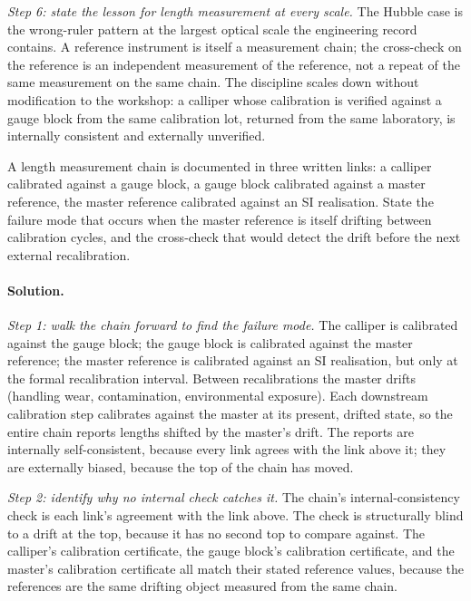 \emph{Step 6: state the lesson for length measurement at every
scale.}
The Hubble case is the wrong-ruler pattern at the largest optical
scale the engineering record contains. A reference instrument is
itself a measurement chain; the cross-check on the reference is an
independent measurement of the reference, not a repeat of the same
measurement on the same chain. The discipline scales down without
modification to the workshop: a calliper whose calibration is
verified against a gauge block from the same calibration lot,
returned from the same laboratory, is internally consistent and
externally unverified.

\begin{exercise}
A length measurement chain is documented in three written links: a
calliper calibrated against a gauge block, a gauge block calibrated
against a master reference, the master reference calibrated against
an SI realisation. State the failure mode that occurs when the
master reference is itself drifting between calibration cycles, and
the cross-check that would detect the drift before the next external
recalibration.
\end{exercise}

\paragraph{Solution.}

\emph{Step 1: walk the chain forward to find the failure mode.}
The calliper is calibrated against the gauge block; the gauge
block is calibrated against the master reference; the master
reference is calibrated against an SI realisation, but only at
the formal recalibration interval. Between recalibrations the
master drifts (handling wear, contamination, environmental
exposure). Each downstream calibration step calibrates against
the master at its present, drifted state, so the entire chain
reports lengths shifted by the master's drift. The reports are
internally self-consistent, because every link agrees with the
link above it; they are externally biased, because the top of the
chain has moved.

\emph{Step 2: identify why no internal check catches it.}
The chain's internal-consistency check is each link's agreement
with the link above. The check is structurally blind to a drift
at the top, because it has no second top to compare against. The
calliper's calibration certificate, the gauge block's calibration
certificate, and the master's calibration certificate all match
their stated reference values, because the references are the
same drifting object measured from the same chain.

